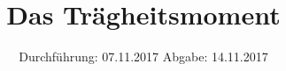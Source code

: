

\subject{V-101}
\title{Das Trägheitsmoment}
\date{%
  Durchführung: 07.11.2017
  \hspace{3em}
  Abgabe: 14.11.2017
}



\maketitle
\thispagestyle{empty}
\tableofcontents
\newpage






\printbibliography{}


